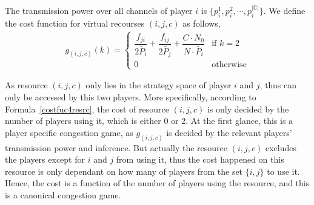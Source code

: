 \documentclass[times]{ettauth}
\theoremstyle{mytheoremstyle}
\theoremstyle{mytheoremstyle}
\theoremstyle{mytheoremstyle}
\begin{document}
The transmission power over all channels of player $i$ is $\{p_i^1, p_i^2,\cdots, p_i^{|\mathbb{C}|}\}$.
We define the cost function for virtual recourses $(i,j,c)$ as follows,
\begin{equation}
\label{costfuc4resrc}
\begin{split}
g_{(i,j,c)}(k) = 
\left\{ \begin{array}{ll}
\dfrac{f_{ji}}{2\tilde{P_i}} + \dfrac{f_{ij}}{2\tilde{P_j}} + \dfrac{C\cdot N_0}{N\cdot \tilde{P_i}} & \mbox{if $k=2$} \\
0 & \mbox{otherwise}
\end{array}
\right.
\end{split}
\end{equation}


As resource $(i,j,c)$ only lies in the strategy space of player $i$ and $j$, thus can only be accessed by this two players.
More specifically, according to Formula~\ref{costfuc4resrc}, the cost of resource $(i,j,c)$ is only decided by the number of players using it, which is either 0 or 2.
At the first glance, this is a player specific congestion game, as $g_{(i,j,c)}$ is decided by the relevant players' transmission power and inference.
But actually the resource ${(i,j,c)}$ excludes the players except for $i$ and $j$ from using it, thus the cost happened on this resource is only dependant on how many of players from the set $\{i, j\}$ to use it.
Hence, the cost is a function of the number of players using the resource, and this is a canonical congestion game.
\end{document}
